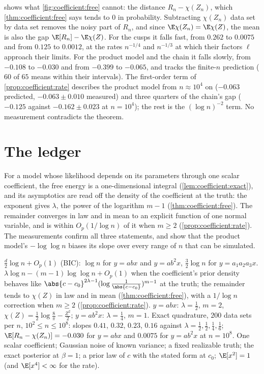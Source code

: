 \begin{refsection}
 shows what \cref{fig:coefficient:free} cannot: the distance $R_n-\chi(Z_n)$, which \cref{thm:coefficient:free} says tends to $0$ in probability. Subtracting $\chi(Z_n)$ data set by data set removes the noisy part of $R_n$, and since $\E\chi(Z_n)=\E\chi(Z)$, the mean is also the gap $\E[R_n]-\E\chi(Z)$. For the cusps it falls fast, from $0.262$ to $0.0075$ and from $0.125$ to $0.0012$, at the rates $n^{-1/4}$ and $n^{-1/3}$ at which their factors $\ell$ approach their limits. For the product model and the chain it falls slowly, from $-0.108$ to $-0.030$ and from $-0.399$ to $-0.065$, and tracks the finite-$n$ prediction ($60$ of $65$ means within their intervals). The first-order term of \cref{prop:coefficient:rate} describes the product model from $n\approx10^4$ on ($-0.063$ predicted, $-0.063\pm0.010$ measured) and three quarters of the chain's gap ($-0.125$ against $-0.162\pm0.023$ at $n=10^4$); the rest is the $(\log n)^{-2}$ term. No measurement contradicts the theorem.

\section{The ledger}\label{sec:coefficient:ledger}

For a model whose likelihood depends on its parameters through one scalar coefficient, the free energy is a one-dimensional integral (\cref{lem:coefficient:exact}), and its asymptotics are read off the density of the coefficient at the truth: the exponent gives $\lambda$, the power of the logarithm $m-1$ (\cref{thm:coefficient:free}). The remainder converges in law and in mean to an explicit function of one normal variable, and is within $O_p(1/\log n)$ of it when $m\ge2$ (\cref{prop:coefficient:rate}). The measurements confirm all three statements, and show that the product model's $-\log\log n$ biases its slope over every range of $n$ that can be simulated.

{$\frac d2\log n+O_p(1)$ (BIC): $\log n$ for $y=abx$ and $y=ab^2x$, $\frac32\log n$ for $y=a_1a_2a_3x$.}
{$\lambda\log n-(m-1)\log\log n+O_p(1)$ when the coefficient's prior density behaves like \mbox{$\abs{c-c_0}^{2\lambda-1}(\log\frac1{\abs{c-c_0}})^{m-1}$} at the truth; the remainder tends to $\chi(Z)$ in law and in mean (\cref{thm:coefficient:free}), with a $1/\log n$ correction when $m\ge2$ (\cref{prop:coefficient:rate}).}
{$y=abx$: $\lambda=\frac12$, $m=2$, $\chi(Z)=\frac12\log\frac8\pi-\frac{Z^2}2$; $y=ab^2x$: $\lambda=\frac14$, $m=1$.}
{Exact quadrature, $200$ data sets per $n$, $10^2\le n\le10^8$: slopes $0.41$, $0.32$, $0.23$, $0.16$ against $\lambda=\frac12,\frac12,\frac14,\frac16$; $\E[R_n-\chi(Z_n)]=-0.030$ for $y=abx$ and $0.0075$ for $y=ab^2x$ at $n=10^8$.}
{One scalar coefficient; Gaussian noise of known variance; a fixed realizable truth; the exact posterior at $\beta=1$; a prior law of $c$ with the stated form at $c_0$; $\E[x^2]=1$ (and $\E[x^4]<\infty$ for the rate).}


\end{refsection}
